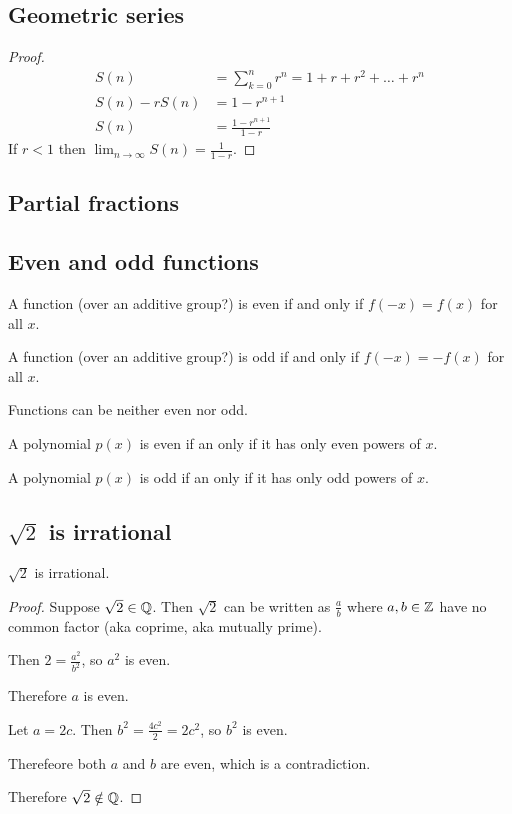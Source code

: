 \subsection{Geometric series}
\begin{proof}
  \begin{align*}
    S(n)          &= \sum_{k=0}^nr^n = 1 + r + r^2 + \ldots + r^n\\
    S(n) - rS(n)  &= 1 - r^{n+1}\\
    S(n)          &= \frac{1 - r^{n+1}}{1 - r}
  \end{align*}
  If $r < 1$ then $\lim_{n \to \infty} S(n) = \frac{1}{1 - r}$.
\end{proof}


\subsection{Partial fractions}


\subsection{Even and odd functions}

\begin{definition*}
  A function (over an additive group?) is even if and only if $f(-x) = f(x)$ for all $x$.

  A function (over an additive group?) is odd if and only if $f(-x) = -f(x)$ for all $x$.
\end{definition*}

Functions can be neither even nor odd.

\begin{claim*}
  A polynomial $p(x)$ is even if an only if it has only even powers of $x$.

  A polynomial $p(x)$ is odd if an only if it has only odd powers of $x$.
\end{claim*}

\subsection{$\sqrt{2}$ is irrational}
\begin{claim*}
  $\sqrt{2}$ is irrational.
\end{claim*}

\begin{proof}
  Suppose $\sqrt{2} \in \mathbb{Q}$. Then $\sqrt{2}$ can be written as $\frac{a}{b}$ where $a, b \in \mathbb{Z}$
  have no common factor (aka coprime, aka mutually prime).

  Then $2 = \frac{a^2}{b^2}$, so $a^2$ is even.

  Therefore $a$ is even.

  Let $a = 2c$. Then $b^2 = \frac{4c^2}{2} = 2c^2$, so $b^2$ is even.

  Therefeore both $a$ and $b$ are even, which is a contradiction.

  Therefore $\sqrt{2} \notin \mathbb{Q}$.
\end{proof}


